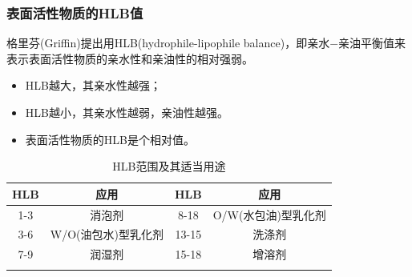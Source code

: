 \begin{frame}
    \frametitle{表面活性物质的HLB值}

    格里芬(Griffin)提出用HLB(hydrophile-lipophile balance)，即亲水$-$亲油平衡值来表示表面活性物质的亲水性和亲油性的相对强弱。
    \begin{itemize}
      \item HLB越大，其亲水性越强；
      \item HLB越小，其亲水性越弱，亲油性越强。
      \item 表面活性物质的HLB是个相对值。
    \end{itemize}
    \begin{table}[]
      \caption{HLB范围及其适当用途}
      \begin{tabular}{cc|cc}
        \Xhline{1pt}
      \rowcolor{maincolor!10}
      HLB & 应用           & HLB   & 应用           \\ \hline
      1-3 & 消泡剂          & 8-18  & O/W(水包油)型乳化剂 \\
      3-6 & W/O(油包水)型乳化剂 & 13-15 & 洗涤剂          \\
      7-9 & 润湿剂          & 15-18 & 增溶剂          \\ \Xhline{1pt}
      \end{tabular}
      \end{table}
\end{frame}